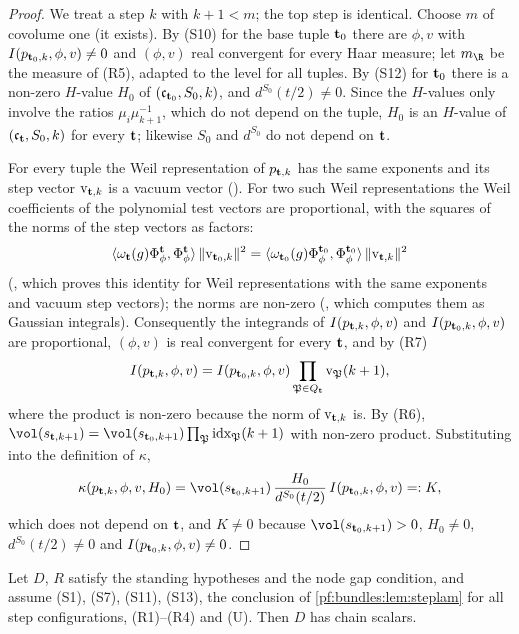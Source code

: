 \begin{proof}
We treat a step $k$ with $k+1<m$; the top step is identical. Choose $m$ of covolume one (it exists). By (S10) for the base tuple $\mathbf t_0$ there
are $\phi,v$ with $I(p_{\mathbf t_0,k},\phi,v)\ne0$ and $(\phi,v)$ real convergent for every Haar measure; let $m_\R$ be the measure of (R5), adapted
to the level for all tuples. By (S12) for $\mathbf t_0$ there is a non-zero $H$-value $H_0$ of $(\mathfrak c_{\mathbf t_0},S_0,k)$, and $d^{S_0}(t/2)\ne0$.
Since the $H$-values only involve the ratios $\mu_i\mu_{k+1}^{-1}$, which do not depend on the tuple, $H_0$ is an $H$-value of
$(\mathfrak c_\mathbf t,S_0,k)$ for every $\mathbf t$; likewise $S_0$ and $d^{S_0}$ do not depend on $\mathbf t$.

For every tuple the Weil representation of $p_{\mathbf t,k}$ has the same exponents and its step vector $\mathrm v_{\mathbf t,k}$ is a vacuum vector
(). For two such Weil representations the Weil coefficients of the polynomial test
vectors are proportional, with the squares of the norms of the step vectors as factors:
\[
\langle\omega_\mathbf t(g)\Phi^\mathbf t_\phi,\Phi^\mathbf t_\phi\rangle\,\|\mathrm v_{\mathbf t_0,k}\|^2=\langle\omega_{\mathbf t_0}(g)\Phi^{\mathbf t_0}_\phi,
\Phi^{\mathbf t_0}_\phi\rangle\,\|\mathrm v_{\mathbf t,k}\|^2
\]
(, which proves this identity for Weil representations with the same exponents
and vacuum step vectors); the norms are non-zero (, which computes them as Gaussian
integrals). Consequently the integrands of $I(p_{\mathbf t,k},\phi,v)$ and $I(p_{\mathbf t_0,k},\phi,v)$ are proportional, $(\phi,v)$ is real
convergent for every $\mathbf t$, and by (R7)
\[
I(p_{\mathbf t,k},\phi,v)=I(p_{\mathbf t_0,k},\phi,v)\prod_{\mathfrak P\in Q_\mathbf t}\mathrm v_{\mathfrak P}(k+1),
\]
where the product is non-zero because the norm of $\mathrm v_{\mathbf t,k}$ is. By (R6), $\vol(s_{\bundt,k+1})=\vol(s_{\bundt_0,k+1})\prod_{\mathfrak
P}\mathrm{idx}_{\mathfrak P}(k+1)$ with non-zero product. Substituting into the definition of $\kappa$,
\[
\kappa(p_{\bundt,k},\phi,v,H_0)=\vol(s_{\bundt_0,k+1})\,\frac{H_0}{d^{S_0}(t/2)}\,I(p_{\bundt_0,k},\phi,v)=:K,
\]
which does not depend on $\mathbf t$, and $K\ne0$ because $\vol(s_{\bundt_0,k+1})>0$, $H_0\ne0$, $d^{S_0}(t/2)\neq0$ and
$I(p_{\mathbf t_0,k},\phi,v)\ne0$.
\end{proof}

\begin{proposition}\label{pf:bundles:prop:assembly}
Let $D$, $R$ satisfy the standing hypotheses and the node gap condition, and assume (S1), (S7), (S11), (S13), the conclusion of
\cref{pf:bundles:lem:steplam} for all step configurations, (R1)--(R4) and (U). Then $D$ has chain scalars.
\end{proposition}

